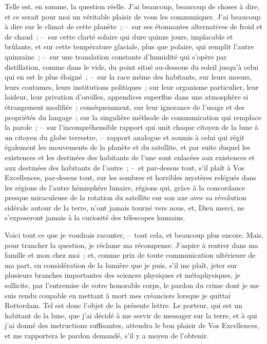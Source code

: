 \documentclass[french,twoside]{book} %
\begin{document}
Telle est, en somme, la question réelle. J’ai beaucoup, beaucoup de choses à dire, et ce serait pour moi un véritable plaisir de vous les communiquer. J’ai beaucoup à dire sur le climat de cette planète ; – sur ses étonnantes alternatives de froid et de chaud ; – sur cette clarté solaire qui dure quinze jours, implacable et brûlante, et sur cette température glaciale, plus que polaire, qui remplit l’autre quinzaine ; – sur une translation constante d’humidité qui s’opère par distillation, comme dans le vide, du point situé au-dessous du soleil jusqu’à celui qui en est le plus éloigné ; – sur la race même des habitants, sur leurs mœurs, leurs coutumes, leurs institutions politiques ; sur leur organisme particulier, leur laideur, leur privation d’oreilles, appendices superflus dans une atmosphère si étrangement modifiée ; conséquemment, sur leur ignorance de l’usage et des propriétés du langage ; sur la singulière méthode de communication qui remplace la parole ; – sur l’incompréhensible rapport qui unit chaque citoyen de la lune à un citoyen du globe terrestre, – rapport analogue et soumis à celui qui régit également les mouvements de la planète et du satellite, et par suite duquel les existences et les destinées des habitants de l’une sont enlacées aux existences et aux destinées des habitants de l’autre ; – et par-dessus tout, s’il plaît à Vos Excellences, par-dessus tout, sur les sombres et horribles mystères relégués dans les régions de l’autre hémisphère lunaire, régions qui, grâce à la concordance presque miraculeuse de la rotation du satellite sur son axe avec sa révolution sidérale autour de la terre, n’ont jamais tourné vers nous, et, Dieu merci, ne s’exposeront jamais à la curiosité des télescopes humains.\par
Voici tout ce que je voudrais raconter, – tout cela, et beaucoup plus encore. Mais, pour trancher la question, je réclame ma récompense. J’aspire à rentrer dans ma famille et mon chez moi ; et, comme prix de toute communication ultérieure de ma part, en considération de la lumière que je puis, s’il me plaît, jeter sur plusieurs branches importantes des sciences physiques et métaphysiques, je sollicite, par l’entremise de votre honorable corps, le pardon du crime dont je me suis rendu coupable en mettant à mort mes créanciers lorsque je quittai Rotterdam. Tel est donc l’objet de la présente lettre. Le porteur, qui est un habitant de la lune, que j’ai décidé à me servir de messager sur la terre, et à qui j’ai donné des instructions suffisantes, attendra le bon plaisir de Vos Excellences, et me rapportera le pardon demandé, s’il y a moyen de l’obtenir.\par
\end{document}
